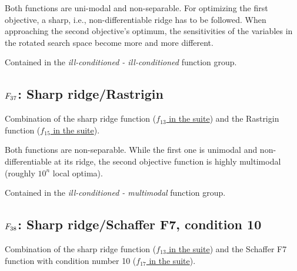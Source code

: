 Both functions are uni-modal and non-separable.
For optimizing the first objective, a sharp, i.e., non-differentiable
ridge has to be followed.
When approaching the second objective's optimum, the sensitivities of the
variables in the rotated search space become more and more different.

Contained in the \emph{ill-conditioned - ill-conditioned} function group.



\subsection[\texorpdfstring{\protect\(F_{37}\protect\): Sharp ridge/Rastrigin}{F37: Sharp ridge/Rastrigin}]{\texorpdfstring{\protect\(F_{37}\protect\): Sharp ridge/Rastrigin}{}}
\label{index:sharp-ridge-rastrigin}\label{index:f37}
Combination of the sharp ridge function (\href{https://coco.gforge.inria.fr/downloads/download16.00/bbobdocfunctions.pdf\#page=65}{\(f_{13}\) in the \bbob suite}) and the Rastrigin function
(\href{https://coco.gforge.inria.fr/downloads/download16.00/bbobdocfunctions.pdf\#page=75}{\(f_{15}\) in the \bbob suite}).

Both functions are non-separable. While the first one
is unimodal and non-differentiable at its ridge, the second objective
function is highly multimodal (roughly \(10^n\) local optima).

Contained in the \emph{ill-conditioned - multimodal} function group.



\subsection[\texorpdfstring{\protect\(F_{38}\protect\): Sharp ridge/Schaffer F7, condition 10}{F38: Sharp ridge/Schaffer F7, condition 10}]{\texorpdfstring{\protect\(F_{38}\protect\): Sharp ridge/Schaffer F7, condition 10}{}}
\label{index:f38}\label{index:sharp-ridge-schaffer-f7-condition-10}
Combination of the sharp ridge function (\href{https://coco.gforge.inria.fr/downloads/download16.00/bbobdocfunctions.pdf\#page=65}{\(f_{13}\) in the \bbob suite}) and the
Schaffer F7 function with condition number 10
(\href{https://coco.gforge.inria.fr/downloads/download16.00/bbobdocfunctions.pdf\#page=85}{\(f_{17}\) in the \bbob suite}).

